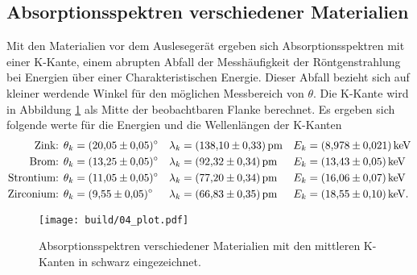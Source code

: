 \subsection{Absorptionsspektren verschiedener Materialien}
Mit den Materialien vor dem Auslesegerät ergeben sich Absorptionsspektren mit einer K-Kante, einem abrupten Abfall
der Messhäufigkeit der Röntgenstrahlung bei Energien über einer Charakteristischen Energie.
Dieser Abfall bezieht sich auf kleiner werdende Winkel für den möglichen Messbereich von $\theta$.
Die K-Kante wird in Abbildung \ref{fig:04} als Mitte der beobachtbaren Flanke berechnet.
Es ergeben sich folgende werte für die Energien und die Wellenlängen der K-Kanten
\begin{align}
    \text{Zink:     } \theta_k &= \qty{20.05 \pm 0.05}{\degree} & \lambda_k &= \qty{138.10 \pm 0.33}{\pico\meter} &     E_k &= \qty{8.978 \pm 0.021}{ \kilo\eV } \\
    \label{eq:absorptionskanten}
    \text{Brom:     } \theta_k &= \qty{13.25 \pm 0.05}{\degree} & \lambda_k &= \qty{92.32 \pm 0.34 }{\pico\meter} &     E_k &= \qty{13.43 \pm 0.05 }{ \kilo\eV }\\
    \text{Strontium:    } \theta_k &= \qty{11.05 \pm 0.05}{\degree} & \lambda_k &= \qty{77.20 \pm 0.34 }{\pico\meter} & E_k &= \qty{16.06 \pm 0.07 }{ \kilo\eV }\\
    \text{Zirconium:    } \theta_k &= \qty{ 9.55 \pm 0.05}{\degree} & \lambda_k &= \qty{66.83 \pm 0.35 }{\pico\meter} & E_k &= \qty{18.55 \pm 0.10}{\kilo\eV}. \\
\end{align}

\begin{figure}
    \centering
    \texttt{[image: build/04\_plot.pdf]}
    \caption{Absorptionsspektren verschiedener Materialien mit den mittleren K-Kanten in schwarz eingezeichnet.}
    \label{fig:04}
\end{figure}






